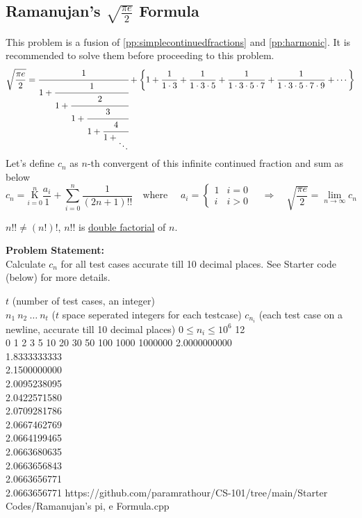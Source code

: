 \subsection{Ramanujan's $\sqrt{\frac{\pi e}{2}}$ Formula}{\label{pp:ramanujanpieformula}}
This problem is a fusion of \ref{pp:simplecontinuedfractions} and \ref{pp:harmonic}. It is recommended to solve them before proceeding to this problem.
\begin{equation}
 \sqrt{\frac{\pi e}{2}}=\cfrac{1}{1+{\cfrac {1}{1+{\cfrac {2}{1+{\cfrac {3}{1+{{\cfrac{4}{1+{_{\ddots }}} }}}}}}}}} + \left\{1 + \frac{1}{1\cdot3}+\frac{1}{1\cdot3\cdot5}+\frac{1}{1\cdot3\cdot5\cdot7}+\frac{1}{1\cdot3\cdot5\cdot7\cdot9}+\cdots\right\}
\end{equation}
Let's define $c_n$ as $n$-th convergent of this infinite continued fraction and sum as below
\begin{equation*}
c_n={\underset {i=0}{\overset {n }{\mathrm {K} }}}{\frac {a_i}{1}} + \sum_{i = 0}^n \frac{1}{(2n+1)!!} \quad\text{where }\quad a_i = \begin{cases} 
      1 & i = 0 \\
      i & i > 0
   \end{cases}\quad\Rightarrow\quad  \sqrt{\frac{\pi e}{2}} = \lim_{n\rightarrow\infty}c_n
\end{equation*}
\begin{note}
$n!! \neq (n!)!$, $n!!$ is \href{https://en.wikipedia.org/wiki/Double_factorial}{double factorial} of $n$.
\end{note}
\textbf{Problem Statement:}\\
Calculate $c_n$ for all test cases accurate till 10 decimal places. See Starter code (below) for more details.
\begin{testcases}
	{$t$ \hfill(number of test cases, an integer)\\$n_1\ n_2\ \ldots\ n_t$ \hfill($t$ space seperated integers for each testcase)}
	{$c_{n_i}$ \hfill(each test case on a newline, accurate till 10 decimal places)}
	{$0 \leq n_i \leq 10^{6}$}
	{12\\0 1 2 3 5 10 20 30 50 100 1000 1000000}
	{2.0000000000\\1.8333333333\\2.1500000000\\2.0095238095\\2.0422571580\\2.0709281786\\2.0667462769\\2.0664199465\\2.0663680635\\2.0663656843\\2.0663656771\\2.0663656771}
	{https://github.com/paramrathour/CS-101/tree/main/Starter Codes/Ramanujan's pi, e Formula.cpp}
\end{testcases}

